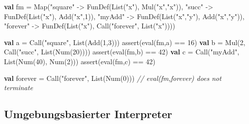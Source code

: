 \documentclass[]{article}
\newenvironment{Shaded}{}{}
\newcommand{\CommentTok}[1]{\textcolor[rgb]{0.38,0.63,0.69}{\textit{#1}}}
\newcommand{\DecValTok}[1]{\textcolor[rgb]{0.25,0.63,0.44}{#1}}
\newcommand{\FunctionTok}[1]{\textcolor[rgb]{0.02,0.16,0.49}{#1}}
\newcommand{\KeywordTok}[1]{\textcolor[rgb]{0.00,0.44,0.13}{\textbf{#1}}}
\newcommand{\NormalTok}[1]{#1}
\newcommand{\StringTok}[1]{\textcolor[rgb]{0.25,0.44,0.63}{#1}}
\begin{document}
\begin{Shaded}
\begin{Highlighting}[]
\KeywordTok{val}\NormalTok{ fm = Map(}\StringTok{"square"}\NormalTok{ {-}\textgreater{} }\FunctionTok{FunDef}\NormalTok{(List(}\StringTok{"x"}\NormalTok{), }\FunctionTok{Mul}\NormalTok{(}\StringTok{"x"}\NormalTok{,}\StringTok{"x"}\NormalTok{)),}
             \StringTok{"succ"}\NormalTok{ {-}\textgreater{} }\FunctionTok{FunDef}\NormalTok{(List(}\StringTok{"x"}\NormalTok{), }\FunctionTok{Add}\NormalTok{(}\StringTok{"x"}\NormalTok{,}\DecValTok{1}\NormalTok{)),}
             \StringTok{"myAdd"}\NormalTok{ {-}\textgreater{} }\FunctionTok{FunDef}\NormalTok{(List(}\StringTok{"x"}\NormalTok{,}\StringTok{"y"}\NormalTok{), }\FunctionTok{Add}\NormalTok{(}\StringTok{"x"}\NormalTok{,}\StringTok{"y"}\NormalTok{)),}
             \StringTok{"forever"}\NormalTok{ {-}\textgreater{} }\FunctionTok{FunDef}\NormalTok{(List(}\StringTok{"x"}\NormalTok{), }\FunctionTok{Call}\NormalTok{(}\StringTok{"forever"}\NormalTok{, List(}\StringTok{"x"}\NormalTok{))))}

\KeywordTok{val}\NormalTok{ a = }\FunctionTok{Call}\NormalTok{(}\StringTok{"square"}\NormalTok{, List(}\FunctionTok{Add}\NormalTok{(}\DecValTok{1}\NormalTok{,}\DecValTok{3}\NormalTok{)))}
\FunctionTok{assert}\NormalTok{(}\FunctionTok{eval}\NormalTok{(fm,a) == }\DecValTok{16}\NormalTok{)}
\KeywordTok{val}\NormalTok{ b = }\FunctionTok{Mul}\NormalTok{(}\DecValTok{2}\NormalTok{, }\FunctionTok{Call}\NormalTok{(}\StringTok{"succ"}\NormalTok{, List(}\FunctionTok{Num}\NormalTok{(}\DecValTok{20}\NormalTok{))))}
\FunctionTok{assert}\NormalTok{(}\FunctionTok{eval}\NormalTok{(fm,b) == }\DecValTok{42}\NormalTok{)}
\KeywordTok{val}\NormalTok{ c = }\FunctionTok{Call}\NormalTok{(}\StringTok{"myAdd"}\NormalTok{, List(}\FunctionTok{Num}\NormalTok{(}\DecValTok{40}\NormalTok{), }\FunctionTok{Num}\NormalTok{(}\DecValTok{2}\NormalTok{)))}
\FunctionTok{assert}\NormalTok{(}\FunctionTok{eval}\NormalTok{(fm,c) == }\DecValTok{42}\NormalTok{)}

\KeywordTok{val}\NormalTok{ forever = }\FunctionTok{Call}\NormalTok{(}\StringTok{"forever"}\NormalTok{, List(}\FunctionTok{Num}\NormalTok{(}\DecValTok{0}\NormalTok{)))}
\CommentTok{// eval(fm,forever) does not terminate}
\end{Highlighting}
\end{Shaded}

\hypertarget{umgebungsbasierter-interpreter}{%
\subsection{Umgebungsbasierter
Interpreter}\label{umgebungsbasierter-interpreter}}
\end{document}
